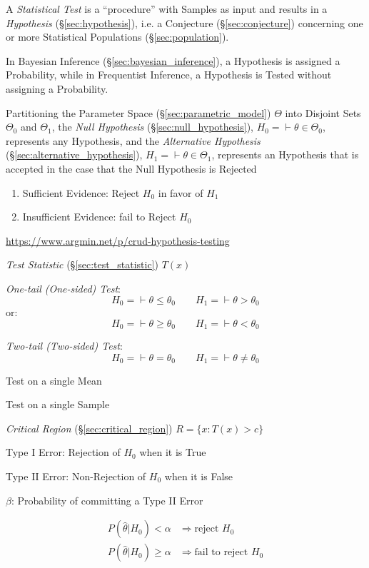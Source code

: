 A \emph{Statistical Test} is a ``procedure'' with Samples as input and results
in a \emph{Hypothesis} (\S\ref{sec:hypothesis}), i.e. a Conjecture
(\S\ref{sec:conjecture}) concerning one or more Statistical Populations
(\S\ref{sec:population}).

\fist In Bayesian Inference (\S\ref{sec:bayesian_inference}), a Hypothesis is
assigned a Probability, while in Frequentist Inference, a Hypothesis is Tested
without assigning a Probability.

Partitioning the Parameter Space (\S\ref{sec:parametric_model}) $\Theta$ into
Disjoint Sets $\Theta_0$ and $\Theta_1$, the \emph{Null Hypothesis}
(\S\ref{sec:null_hypothesis}), $H_0 = \vdash \theta \in \Theta_0$, represents
any Hypothesis, and the \emph{Alternative Hypothesis}
(\S\ref{sec:alternative_hypothesis}), $H_1 = \vdash \theta \in \Theta_1$,
represents an Hypothesis that is accepted in the case that the Null Hypothesis
is Rejected

\begin{enumerate}
  \item Sufficient Evidence: Reject $H_0$ in favor of $H_1$
  \item Insufficient Evidence: fail to Reject $H_0$
\end{enumerate}

\url{https://www.argmin.net/p/crud-hypothesis-testing}

\emph{Test Statistic} (\S\ref{sec:test_statistic}) $T(x)$

\emph{One-tail (One-sided) Test}:
\[
  H_0 = \vdash \theta \leq \theta_0 \quad\quad H_1 = \vdash \theta > \theta_0
\]
or:
\[
  H_0 = \vdash \theta \geq \theta_0 \quad\quad H_1 = \vdash \theta < \theta_0
\]

\emph{Two-tail (Two-sided) Test}:
\[
  H_0 = \vdash \theta = \theta_0 \quad\quad H_1 = \vdash \theta \neq \theta_0
\]

Test on a single Mean

Test on a single Sample

\emph{Critical Region} (\S\ref{sec:critical_region}) $R = \{ x : T(x) > c \}$

Type I Error: Rejection of $H_0$ when it is True

Type II Error: Non-Rejection of $H_0$ when it is False

$\beta$: Probability of committing a Type II Error

\begin{align*}
  P(\hat{\theta} | H_0) < \alpha & \Rightarrow \text{reject } H_0 \\
  P(\hat{\theta} | H_0) \geq \alpha & \Rightarrow \text{fail to reject } H_0 \\
\end{align*}

